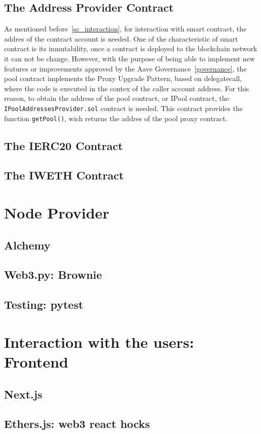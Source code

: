 \documentclass[11pt,a4paper]{report}
\begin{document}
\subsection{The Address Provider Contract}
As mentioned before~\ref{sc_interaction}, for interaction with smart contract, the addres of the contract account is needed. One of the characteristic of smart contract is its inmutability, once a contract is deployed to the blockchain network it can not be change. However, with the purpose of being able to implement new features or improvements approved by the Aave Governance~\ref{governance}, the pool contract implements the Proxy Upgrade Pattern\cite{ozproxy}, based on delegatecall\cite{delegatecall}, where the code is executed in the contex of the caller account address. For this reason, to obtain the address of the pool contract, or IPool contract, the \verb|IPoolAddressesProvider.sol| contract is needed. This contract provides the function \verb|getPool()|, wich returns the addres of the pool proxy contract.
\subsection{The IERC20 Contract}
\subsection{The IWETH Contract}
\section{Node Provider}
\subsection{Alchemy}

\subsection{Web3.py: Brownie}
\subsection{Testing: pytest}
\section{Interaction with the users: Frontend}
\subsection{Next.js}
\subsection{Ethers.js: web3 react hocks}
\end{document}
